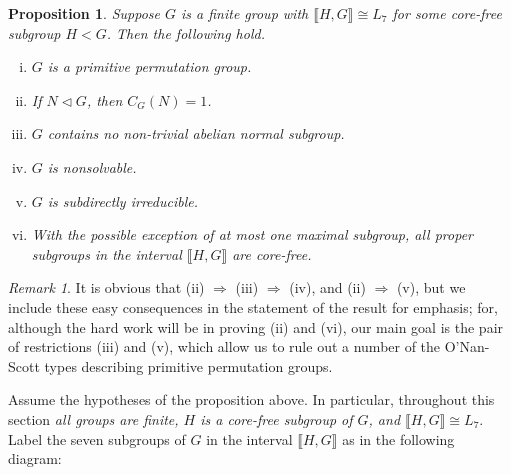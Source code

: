 \documentclass{gen-j-l}
\newcommand{\lb}{\ensuremath{\llbracket}}
\newcommand{\rb}{\ensuremath{\rrbracket}}
\newcommand{\<}{\ensuremath{\langle}}
\renewcommand{\>}{\ensuremath{\rangle}}
\theoremstyle{plain}
\newtheorem{prop}[theorem]{Proposition}
\theoremstyle{definition}
\theoremstyle{remark}
\newtheorem*{remark}{Remark}
\numberwithin{theorem}{section}
\numberwithin{claim}{section}
\numberwithin{equation}{section}
\numberwithin{conjecture}{section}
\newcommand{\ssubnormal}{\ensuremath{\vartriangleleft}}
\newcommand{\2}{\ensuremath{\mathbf{2}}}
\newcommand{\3}{\ensuremath{\mathbf{3}}}
\begin{document}
\begin{prop}
\label{thm:except-seven-elem}
Suppose $G$ is a finite group with $\lb H,G \rb\cong L_7$ for some core-free subgroup $H<G$.  Then the following hold.
\begin{enumerate}[(i)]
\item $G$ is a primitive permutation group.
\item If $N\ssubnormal G$, then $C_G(N) = 1$.
\item $G$ contains no non-trivial abelian normal subgroup.
\item $G$ is nonsolvable.
\item $G$ is subdirectly irreducible.
\item With the possible exception of at most one maximal subgroup,
  all proper subgroups in the interval $\lb H,G \rb$ are core-free. 

\end{enumerate}
\end{prop}
\begin{remark}
  It is obvious that (ii) $\Rightarrow$ (iii) $\Rightarrow$ (iv), and  (ii) $\Rightarrow$
  (v), but we include these easy consequences in the statement of the result for
  emphasis; for, although the hard work will be in proving (ii) and (vi), our
  main goal is the pair of restrictions (iii) and (v), which allow us to rule
  out a number of the O'Nan-Scott types describing primitive permutation
  groups.  
\end{remark}

Assume the hypotheses of the proposition above.  In particular, throughout this
section \emph{all groups are finite, $H$ is a core-free subgroup of $G$, and $\lb H,G \rb \cong
  L_7$}. Label the seven subgroups of $G$ in
the interval $\lb H,G \rb$ as in the following diagram:

\begin{center}
  {

  }
\end{center}
\end{document}
